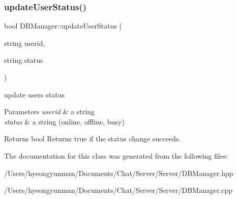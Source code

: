 \subsubsection{\texorpdfstring{update\+User\+Status()}{updateUserStatus()}}
{\footnotesize\ttfamily bool D\+B\+Manager\+::update\+User\+Status (\begin{DoxyParamCaption}\item[{string}]{userid,  }\item[{string}]{status }\end{DoxyParamCaption})}



update user\textquotesingle{}s status 


\begin{DoxyParams}{Parameters}
{\em userid} & a string \\
\hline
{\em status} & a string (online, offline, busy) \\
\hline
\end{DoxyParams}
\begin{DoxyReturn}{Returns}
bool Returns true if the status change succeeds. 
\end{DoxyReturn}


The documentation for this class was generated from the following files\+:\begin{DoxyCompactItemize}
\item 
/\+Users/hyeongyunmun/\+Documents/\+Chat/\+Server/\+Server/D\+B\+Manager.\+hpp\item 
/\+Users/hyeongyunmun/\+Documents/\+Chat/\+Server/\+Server/D\+B\+Manager.\+cpp\end{DoxyCompactItemize}
